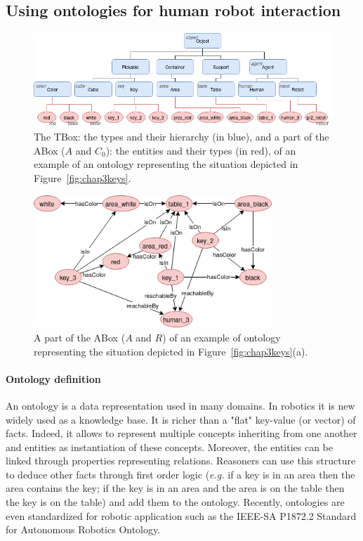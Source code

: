 \documentclass[a4paper,11pt,twoside]{StyleThese}
\begin{document}
\subsection{Using ontologies for human robot interaction}
\begin{figure}[hbtp]
\centering
\includegraphics[width=\textwidth]{figures/chapter3/AboxTbox.png}
\caption{The TBox: the types and their hierarchy (in blue), and a part of the ABox ($A$ and $C_0$): the entities and their types (in red), of an example of an ontology representing the situation depicted in Figure~\ref{fig:chap3keys}.}
\label{fig:chap3aboxtbox}
\end{figure}

\begin{figure}[hbtp]
\centering
\includegraphics[width=0.8\textwidth]{figures/chapter3/ABoxR.png}
\caption{A part of the ABox ($A$ and $R$) of an example of ontology representing the situation depicted in Figure~\ref{fig:chap3keys}(a).}
\label{fig:chap3aboxrel}
\end{figure}

\paragraph{Ontology definition}
An ontology is a data representation used in many domains. In robotics it is new widely used as a knowledge base. It is richer than a "flat" key-value (or vector) of facts. Indeed, it allows to represent multiple concepts inheriting from one another and entities as instantiation of these concepts. Moreover, the entities can be linked through properties representing relations. Reasoners can use this structure to deduce other facts through first order logic (\textit{e.g.} if a key is in an area then the area contains the key; if the key is in an area and the area is on the table then the key is on the table) and add them to the ontology. Recently, ontologies are even standardized for robotic application such as the IEEE-SA P1872.2 Standard for Autonomous Robotics Ontology.
\end{document}
